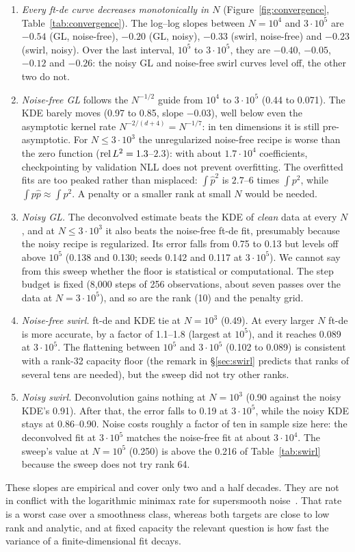 \begin{enumerate}[leftmargin=2em,itemsep=2pt]
\item \emph{Every ft-de curve decreases monotonically in $N$} (Figure~\ref{fig:convergence},
Table~\ref{tab:convergence}). The log--log slopes between $N=10^4$ and $3\cdot10^5$ are $-0.54$ (GL, noise-free), $-0.20$ (GL, noisy),
$-0.33$ (swirl, noise-free) and $-0.23$ (swirl, noisy). Over the last interval, $10^5$ to $3\cdot10^5$, they are
$-0.40$, $-0.05$, $-0.12$ and $-0.26$: the noisy GL and noise-free swirl curves level off, the other two do not.
\item \emph{Noise-free GL} follows the $N^{-1/2}$ guide from $10^4$ to $3\cdot10^5$ (0.44 to 0.071). The KDE barely moves
(0.97 to 0.85, slope $-0.03$), well below even the asymptotic kernel rate $N^{-2/(d+4)}=N^{-1/7}$: in ten
dimensions it is still pre-asymptotic. For $N\le3\cdot10^3$ the unregularized noise-free recipe is worse than
the zero function ($\operatorname{rel}L^2=1.3$--$2.3$): with about $1.7\cdot10^4$ coefficients, checkpointing by validation NLL
does not prevent overfitting. The overfitted fits are too peaked rather than misplaced: $\int\hat p^2$ is
$2.7$--$6$ times $\int p^2$, while $\int p\hat p\approx\int p^2$. A penalty or a smaller rank at small $N$ would be needed.
\item \emph{Noisy GL.} The deconvolved estimate beats the KDE of \emph{clean} data at every $N$, and at $N\le3\cdot10^3$
it also beats the noise-free ft-de fit, presumably because the noisy recipe is regularized. Its error falls from 0.75 to 0.13
but levels off above $10^5$ (0.138 and 0.130; seeds 0.142 and 0.117 at $3\cdot10^5$). We cannot say from this sweep whether the floor is statistical
or computational. The step budget is fixed (8{,}000 steps of 256 observations, about seven passes over the data at
$N=3\cdot10^5$), and so are the rank (10) and the penalty grid.
\item \emph{Noise-free swirl.} ft-de and KDE tie at $N=10^3$ (0.49). At every larger $N$ ft-de is more accurate, by a
factor of 1.1--1.8 (largest at $10^5$), and it reaches 0.089 at $3\cdot10^5$. The flattening between $10^5$ and $3\cdot10^5$ (0.102 to 0.089) is
consistent with a rank-32 capacity floor (the remark in \S\ref{sec:swirl} predicts that ranks of several tens are
needed), but the sweep did not try other ranks.
\item \emph{Noisy swirl.} Deconvolution gains nothing at $N=10^3$ (0.90 against the noisy KDE's 0.91). After that, the error
falls to 0.19 at $3\cdot10^5$, while the noisy KDE stays at 0.86--0.90. Noise costs roughly a factor of ten in
sample size here: the deconvolved fit at $3\cdot10^5$ matches the noise-free fit at about $3\cdot10^4$. The sweep's
value at $N=10^5$ (0.250) is above the 0.216 of Table~\ref{tab:swirl} because the sweep does not try rank 64.
\end{enumerate}
These slopes are empirical and cover only two and a half decades. They are not in conflict with the logarithmic
minimax rate for supersmooth noise~\cite{fan1991optimal}. That rate is a worst case over a smoothness class, whereas
both targets are close to low rank and analytic, and at fixed capacity the relevant question is how fast the variance
of a finite-dimensional fit decays.

